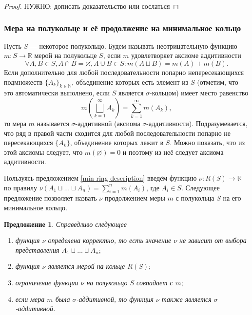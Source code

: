 \documentclass[12pt]{article}
\newtheorem{proposition}[theorem]{Предложение}
\numberwithin{theorem}{section}
\theoremstyle{definition}
\newcommand{\defin}[2]{\hypertarget{#2}{{\color{red} #1}}}
\newcommand{\RR}{\mathbb{R}}
\newcommand{\TODO}[1]{\textcolor{todocolor}{НУЖНО: #1}}
\begin{document}
	\begin{proof}
		\TODO{дописать доказательство или сослаться}
	\end{proof}
	
	\subsubsection{Мера на полукольце и её продолжение на минимальное кольцо}
	
	Пусть $ S $ --- некоторое полукольцо.
	Будем называть неотрицательную функцию $ m \colon S \to \RR $ \defin{мерой}{measure} на полукольце $ S $, 
	если $ m $ удовлетворяет аксиоме аддитивности
	$$ \forall A, B \in S, A \cap B = \varnothing, A \cup B \in S: m(A \sqcup B) = m(A) + m(B). $$
	Если дополнительно для любой последовательности попарно непересекающихся подмножеств $ \{A_k\}_{k \in \mathbb{N}} $,
	объединение которых есть элемент из $ S $ (отметим, что это автоматически выполнено, если $ S $ является $ \sigma $-кольцом)
	имеет место равенство
	$$ m\left(\bigsqcup\limits_{k = 1}^{\infty} A_k \right) = \sum\limits_{k = 1}^{\infty} m(A_k), $$
	то мера $ m $ называется \defin{$ \sigma $-аддитивной}{sigma-measure} (аксиома $ \sigma $-аддитивности).
	Подразумевается, что ряд в правой части сходится для любой последовательности попарно не пересекающихся $ \{A_k\} $, объединение которых лежит в $ S $.
	Можно показать, что из этой аксиомы следует, что $ m(\varnothing) = 0 $ и поэтому из неё следует аксиома аддитивности.
	
	Пользуясь предложением \ref{min ring description} введём функцию $ \nu \colon R(S) \to \RR $
	по правилу $ \nu(A_1 \sqcup \ldots \sqcup A_n) = \sum\limits_{i = 1}^{n} m(A_i) $, где $ A_i \in S $.
	Следующее предложение позволяет назвать $ \nu $ \defin{продолжением меры $ m $ с полукольца $ S $ на его минимальное кольцо}
	{extension-to-min-ring}.
	
	\begin{proposition}
		Справедливо следующее
		\begin{enumerate}
			\item функция $ \nu $ определена корректно, то есть значение $ \nu $ не зависит от выбора представления
			$ A_1 \sqcup \ldots \sqcup A_n; $
			\item функция $ \nu $ является мерой на кольце $ R(S); $
			\item ограничение функции $ \nu $ на полукольцо $ S $ совпадает с $ m; $
			\item если мера $ m $ была $ \sigma $-аддитивной, то функция $ \nu $ также является $ \sigma $-аддитивной.
		\end{enumerate}
	\end{proposition}
	
\end{document}
